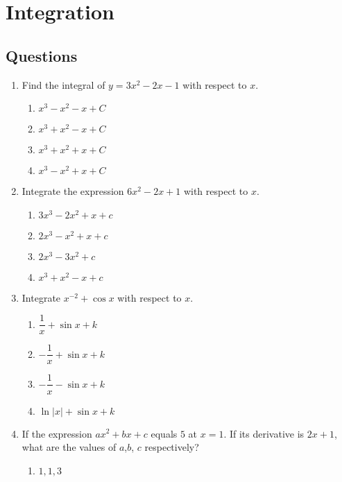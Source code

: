 \section{Integration}
\subsection{Questions}
\begin{multicols}{2}
  \begin{enumerate}[label={\arabic*.}]
    \item Find the integral of \(y = 3{x}^{2}-2x-1\) with respect to \(x\).
      \begin{enumerate}[label={\Alph*.}]
        \item \({x}^{3} - {x}^{2} - x + C\)
        \item \({x}^{3} + {x}^{2} - x + C\)
        \item \({x}^{3} + {x}^{2} + x + C\)
        \item \({x}^{3} - {x}^{2} + x + C\)
      \end{enumerate}
    \item Integrate the expression \(6{x}^{2} - 2x + 1\) with respect to \(x\).
      \begin{enumerate}[label={\Alph*.}]
        \item \(3{x}^{3} - 2{x}^{2} + x + c\)
        \item \(2{x}^{3} - x^{2} + x + c\)
        \item \(2{x}^{3} - 3{x}^{2} + c\)
        \item \({x}^{3} + {x}^{2} - x + c\)
      \end{enumerate}
    \item Integrate \(x^{-2} + \cos {x}\) with respect to \(x\).
      \begin{enumerate}[label={\Alph*.}]
        \item \(\dfrac{1}{x} + \sin {x} + k\)
        \item \(-\dfrac{1}{x} + \sin {x} + k\)
        \item \(-\dfrac{1}{x} - \sin {x} + k\)
        \item \(\ln|x| + \sin {x} + k\)
      \end{enumerate}
    \item If the expression \(a{x}^{2} + bx + c\) equals \(5\) at \(x = 1\). If its derivative is \(2x + 1\), what are the values of \(a\),\(b\), \(c\) respectively?
      \begin{enumerate}[label={\Alph*.}]
        \item \(1, 1, 3\)

\end{enumerate}
\end{enumerate}
\end{multicols}
